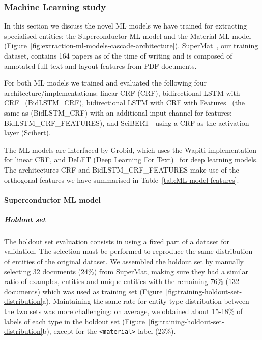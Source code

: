 \documentclass[]{interact}
\theoremstyle{plain}%
\theoremstyle{definition}
\theoremstyle{remark}
\begin{document}
\subsubsection*{Machine Learning study}

In this section we discuss the novel ML models we have trained for extracting specialised entities: the Superconductor ML model and the Material ML model (Figure~\ref{fig:extraction-ml-models-cascade-architecture}).
SuperMat~\cite{foppiano2021supermat}, our training dataset, contains 164 papers as of the time of writing and is composed of annotated full-text and layout features from PDF documents.

For both ML models we trained and evaluated the following four architecture/implementations: linear CRF (CRF), bidirectional LSTM with CRF~\cite{Lample2016NeuralAF} (BidLSTM\_CRF), bidirectional LSTM with CRF with Features~\cite{Lample2016NeuralAF} (the same as (BidLSTM\_CRF) with an additional input channel for features; BidLSTM\_CRF\_FEATURES), and SciBERT~\cite{Beltagy2019SciBERT} using a CRF as the activation layer (Scibert).

The ML models are interfaced by Grobid, which uses the Wapiti\cite{lavergne2010practical} implementation for linear CRF, and DeLFT (Deep Learning For Text)~\cite{DeLFT} for deep learning models.
The architectures CRF and BidLSTM\_CRF\_FEATURES make use of the orthogonal features we have summarised in Table~\ref{tab:ML-model-features}.

\paragraph*{Superconductor ML model}

\subparagraph*{Holdout set}
The holdout set evaluation consists in using a fixed part of a dataset for validation. 
The selection must be performed to reproduce the same distribution of entities of the original dataset.
We assembled the holdout set by manually selecting 32 documents (24\%) from SuperMat, making sure they had a similar ratio of examples, entities and unique entities with the remaining 76\% (132 documents) which was used as training set (Figure~\ref{fig:training-holdout-set-distribution}a).
Maintaining the same rate for entity type distribution between the two sets was more challenging: on average, we obtained about 15-18\% of labels of each type in the holdout set (Figure~\ref{fig:training-holdout-set-distribution}b), except for the \texttt{<material>} label (23\%). %
\end{document}
